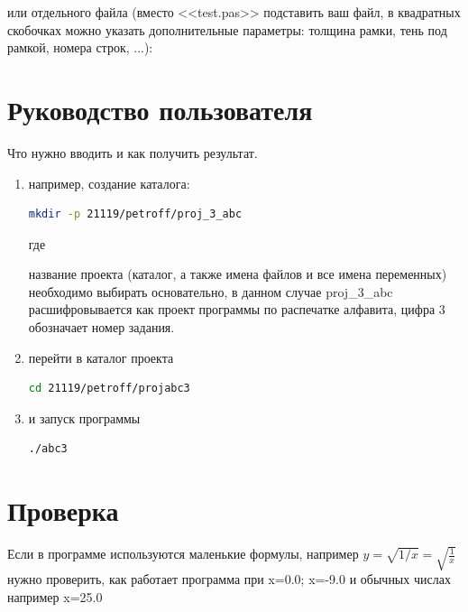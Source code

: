 или отдельного файла (вместо <<test.pas>> подставить ваш файл, в
квадратных скобочках можно указать дополнительные параметры: толщина
рамки, тень под рамкой, номера строк, ...):








\section{Руководство пользователя}
Что нужно вводить и как получить результат.

\begin{enumerate}
\item например, создание каталога:
  
  \begin{lstlisting}[language=bash]
    mkdir -p 21119/petroff/proj_3_abc
  \end{lstlisting}
  
  где 
  название проекта (каталог, а также имена файлов и все имена
  переменных) необходимо выбирать основательно, в данном случае
  proj\_3\_abc расшифровывается как проект программы по распечатке
  алфавита, цифра 3 обозначает номер задания.
  
\item перейти в каталог проекта
  \begin{lstlisting}[language=bash]
    cd 21119/petroff/projabc3
  \end{lstlisting}
  
\item и запуск программы
  \begin{lstlisting}[language=bash]
    ./abc3
  \end{lstlisting}
  
\end{enumerate}







\section{Проверка}
Если в программе используются маленькие формулы, например
$y = \sqrt{1/x} = \sqrt{\frac{1}{x}}$ нужно проверить, как работает
программа при x=0.0; x=-9.0 и обычных числах например x=25.0

